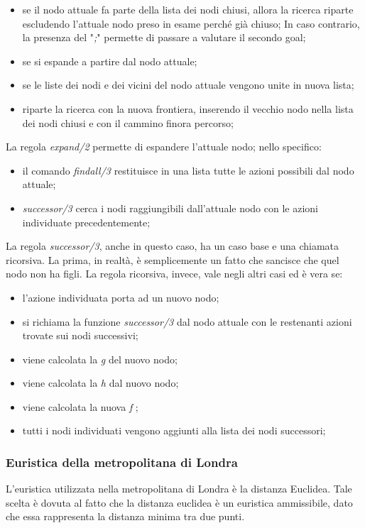 \documentclass[12pt]{report}
\begin{document}
\begin{itemize}
\item se il nodo attuale fa parte della lista dei nodi chiusi, allora la ricerca riparte escludendo l'attuale nodo preso in esame perché già chiuso; In caso contrario, la presenza del "\emph{;}" permette di passare a valutare il secondo goal;
\item se si espande a partire dal nodo attuale;
\item se le liste dei nodi e dei vicini del nodo attuale vengono unite in nuova lista;
\item riparte la ricerca con la nuova frontiera, inserendo il vecchio nodo nella lista dei nodi chiusi e con il cammino finora percorso;
\end{itemize}
La regola \emph{expand/2} permette di espandere l'attuale nodo; nello specifico:

\begin{itemize}
\item il comando \emph{findall/3} restituisce in una lista tutte le azioni possibili dal nodo attuale;
\item \emph{successor/3} cerca i nodi raggiungibili dall'attuale nodo con le azioni individuate precedentemente;
\end{itemize}

La regola \emph{successor/3}, anche in questo caso, ha un caso base e una chiamata ricorsiva. La prima, in realtà, è semplicemente un fatto che sancisce che quel nodo non ha figli. La regola ricorsiva, invece, vale negli altri casi ed è vera se:

\begin{itemize}
\item l'azione individuata porta ad un nuovo nodo;
\item si richiama la funzione \emph{successor/3} dal nodo attuale con le restenanti azioni trovate sui nodi successivi;
\item viene calcolata la \emph{g} del nuovo nodo;
\item viene calcolata la \emph{h} dal nuovo nodo;
\item viene calcolata la nuova \emph{f} ;
\item tutti i nodi individuati vengono aggiunti alla lista dei nodi successori;
\end{itemize}

\subsubsection{Euristica della metropolitana di Londra}
L'euristica utilizzata nella metropolitana di Londra è la distanza Euclidea. Tale scelta è dovuta al fatto che la distanza euclidea è un euristica ammissibile, dato che essa rappresenta la distanza minima tra due punti.
\end{document}
